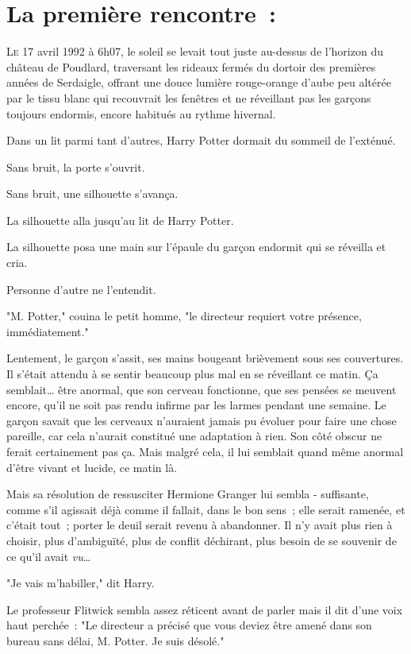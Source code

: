 
\section{La première rencontre~:}

\lettrine{L}{e} 17 avril 1992 à 6h07, le soleil se levait tout juste au-dessus de l'horizon du château de Poudlard, traversant les rideaux fermés du dortoir des premières années de Serdaigle, offrant une douce lumière rouge-orange d'aube peu altérée par le tissu blanc qui recouvrait les fenêtres et ne réveillant pas les garçons toujours endormis, encore habitués au rythme hivernal.

Dans un lit parmi tant d'autres, Harry Potter dormait du sommeil de l'exténué.

Sans bruit, la porte s'ouvrit.

Sans bruit, une silhouette s'avança.

La silhouette alla jusqu'au lit de Harry Potter.

La silhouette posa une main sur l'épaule du garçon endormit qui se réveilla et cria.

Personne d'autre ne l'entendit.

"M. Potter," couina le petit homme, "le directeur requiert votre présence, immédiatement."

Lentement, le garçon s'assit, ses mains bougeant brièvement sous ses couvertures. Il s'était attendu à se sentir beaucoup plus mal en se réveillant ce matin. Ça semblait… être anormal, que son cerveau fonctionne, que ses pensées se meuvent encore, qu'il ne soit pas rendu infirme par les larmes pendant une semaine. Le garçon savait que les cerveaux n'auraient jamais pu évoluer pour faire une chose pareille, car cela n'aurait constitué une adaptation à rien. Son côté obscur ne ferait certainement pas ça. Mais malgré cela, il lui semblait quand même anormal d'être vivant et lucide, ce matin là.

Mais sa résolution de ressusciter Hermione Granger lui sembla - suffisante, comme s'il agissait déjà comme il fallait, dans le bon sens~; elle serait ramenée, et c'était tout~; porter le deuil serait revenu à abandonner. Il n'y avait plus rien à choisir, plus d'ambiguïté, plus de conflit déchirant, plus besoin de se souvenir de ce qu'il avait \emph{vu}…

"Je vais m'habiller," dit Harry.

Le professeur Flitwick sembla assez réticent avant de parler mais il dit d'une voix haut perchée~: "Le directeur a précisé que vous deviez être amené dans son bureau sans délai, M. Potter. Je suis désolé."

